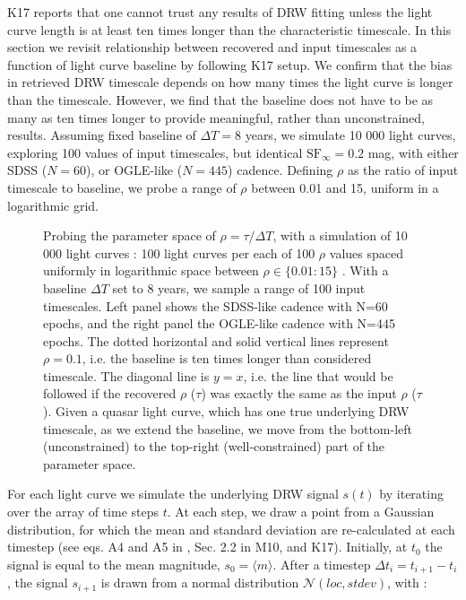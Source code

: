 \documentclass[twocolumn]{aastex62}
\begin{document}
K17 reports that one cannot trust any results of DRW fitting unless the light curve length is at least ten times longer than the characteristic timescale. In this section we revisit relationship between recovered and input timescales as a function of light curve baseline by following K17 setup. We confirm that the bias in retrieved DRW timescale depends on how many times the light curve is longer than the timescale. However, we find that the baseline does not have to be as many as ten times longer to provide meaningful, rather than unconstrained, results. Assuming fixed baseline of $\Delta T = 8$ years, we simulate 10 000 light curves, exploring 100 values of input timescales, but identical $\mathrm{SF}_{\infty}=0.2$ mag, with either SDSS ($N=60$), or OGLE-like ($N=445$) cadence. Defining $\rho$ as the ratio of input timescale to baseline, we probe a range of $\rho$ between 0.01 and 15, uniform in a logarithmic grid.

\begin{figure*}  %
\caption{Probing the parameter space of $\rho = \tau / \Delta T$, with a simulation of  10 000 light curves : 100 light curves per each of 100 $\rho$ values spaced uniformly in logarithmic space between $\rho \in   \{ 0.01 : 15\}$ . With a baseline $\Delta T$ set to 8 years,  we sample a range of 100 input timescales. Left panel shows the SDSS-like cadence with N=60 epochs, and the right panel the OGLE-like cadence with N=445 epochs. The dotted horizontal and solid vertical lines represent $\rho = 0.1$, i.e. the baseline is ten times longer than considered timescale. The diagonal line is $y=x$, i.e. the line that would be followed if the recovered  $\rho$ ($\tau$) was exactly the same as the input $\rho$ ($\tau$). Given a quasar light curve, which has one true underlying DRW timescale,  as we extend the baseline, we move from the bottom-left (unconstrained) to the top-right (well-constrained) part of the parameter space. } 
\label{fig:rho_space}
\end{figure*}


For each light curve we simulate the underlying DRW signal $s(t)$ by iterating over the array of time steps $t$.  At each step, we draw a point from a Gaussian distribution, for which the mean and standard deviation are re-calculated at each timestep (see eqs. A4 and A5 in \citealt{kelly2009}, Sec. 2.2 in M10, and K17). Initially, at $t_{0}$ the signal is equal to the mean magnitude, $s_{0} = \langle m \rangle$. After a timestep $\Delta t_{i} = t_{i+1} - t_{i}$, the signal $s_{i+1}$ is drawn from  a normal distribution $\mathcal{N}(loc, stdev)$, with : 
\end{document}
